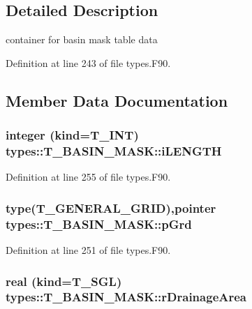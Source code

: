\subsection{Detailed Description}
container for basin mask table data 

Definition at line 243 of file types.F90.



\subsection{Member Data Documentation}
\hypertarget{typetypes_1_1_t___b_a_s_i_n___m_a_s_k_a2c5a49fa08b7d530c404c93f4c79460e}{
\subsubsection[{iLENGTH}]{\setlength{\rightskip}{0pt plus 5cm}integer (kind={\bf T\_\-INT}) {\bf types::T\_\-BASIN\_\-MASK::iLENGTH}}}
\label{typetypes_1_1_t___b_a_s_i_n___m_a_s_k_a2c5a49fa08b7d530c404c93f4c79460e}


Definition at line 255 of file types.F90.

\hypertarget{typetypes_1_1_t___b_a_s_i_n___m_a_s_k_a449a8c3d41d08d96d47e73b53eeacbdf}{
\subsubsection[{pGrd}]{\setlength{\rightskip}{0pt plus 5cm}type({\bf T\_\-GENERAL\_\-GRID}),pointer {\bf types::T\_\-BASIN\_\-MASK::pGrd}}}
\label{typetypes_1_1_t___b_a_s_i_n___m_a_s_k_a449a8c3d41d08d96d47e73b53eeacbdf}


Definition at line 251 of file types.F90.

\hypertarget{typetypes_1_1_t___b_a_s_i_n___m_a_s_k_ad1549992d679cfda8e698c291d8cad5b}{
\subsubsection[{rDrainageArea}]{\setlength{\rightskip}{0pt plus 5cm}real (kind={\bf T\_\-SGL}) {\bf types::T\_\-BASIN\_\-MASK::rDrainageArea}}}
\label{typetypes_1_1_t___b_a_s_i_n___m_a_s_k_ad1549992d679cfda8e698c291d8cad5b}


